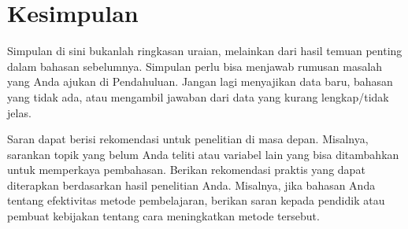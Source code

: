 \section{Kesimpulan}


Simpulan di sini bukanlah ringkasan uraian, melainkan dari hasil temuan penting dalam bahasan sebelumnya. Simpulan perlu bisa menjawab rumusan masalah yang Anda ajukan di Pendahuluan. Jangan lagi menyajikan data baru, bahasan yang tidak ada, atau mengambil jawaban dari data yang kurang lengkap/tidak jelas.

Saran dapat berisi rekomendasi untuk penelitian di masa depan. Misalnya, sarankan topik yang belum Anda teliti atau variabel lain yang bisa ditambahkan untuk memperkaya pembahasan. Berikan rekomendasi praktis yang dapat diterapkan berdasarkan hasil penelitian Anda. Misalnya, jika bahasan Anda tentang efektivitas metode pembelajaran, berikan saran kepada pendidik atau pembuat kebijakan tentang cara meningkatkan metode tersebut.